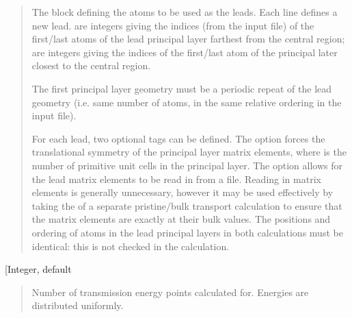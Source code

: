 \documentclass[letterpaper,10pt,english]{sphinxmanual}
\begin{document}
\begin{quote}

\begin{DUlineblock}{0em}
\item[] 
\item[]
\begin{DUlineblock}{\DUlineblockindent}
\item[] 
\item[] 
\item[] 
\end{DUlineblock}
\item[] 
\item[] The block defining the atoms to be used as the leads. Each line defines a new lead.  are integers giving the indices (from the input file) of the first/last atoms of the lead principal layer farthest from the central region;  are integers giving the indices of the first/last atom of the principal later closest to the central region.
\item[] The first principal layer geometry must be a periodic repeat of the lead geometry (i.e. same number of atoms, in the same relative ordering in the input file).
\item[] For each lead, two optional tags can be defined. The option  forces the translational symmetry of the principal layer matrix elements, where  is the number of primitive unit cells in the principal layer. The option  allows for the lead matrix elements to be read in from a  file. Reading in matrix elements is generally unnecessary, however it may be used effectively by taking the  of a separate pristine/bulk transport calculation to ensure that the matrix elements are exactly at their bulk values. The positions and ordering of atoms in the lead principal layers in both calculations must be identical: this is not checked in the calculation.
\end{DUlineblock}
\end{quote}

 {[}Integer, default \sphinxcode{etrans\_enum: 50}{]}
\begin{quote}

\begin{DUlineblock}{0em}
\item[] Number of transmission energy points calculated for. Energies are
distributed uniformly.
\end{DUlineblock}
\end{quote}
\end{document}
